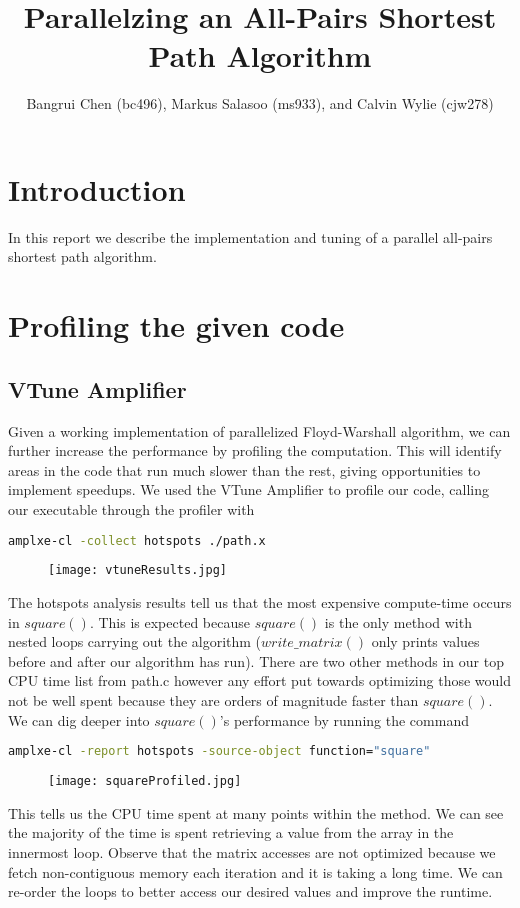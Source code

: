 \documentclass[11pt]{article}
\title{Parallelzing an All-Pairs Shortest Path Algorithm}
\author{Bangrui Chen (bc496), Markus Salasoo (ms933), and Calvin Wylie (cjw278)}
\begin{document}
\maketitle

\section*{Introduction}

In this report we describe the implementation and tuning of a parallel all-pairs shortest
path algorithm.

\section*{Profiling the given code}

\subsection*{VTune Amplifier}
Given a working implementation of parallelized Floyd-Warshall algorithm, we can further increase the performance by profiling the computation. This will identify areas in the code that run much slower than the rest, giving opportunities to implement speedups. We used the VTune Amplifier to profile our code, calling our executable through the profiler with
\begin{lstlisting}[language=bash]
amplxe-cl -collect hotspots ./path.x
\end{lstlisting}
\begin{figure}[ht!]
\centering
\texttt{[image: vtuneResults.jpg]}
\end{figure}
The hotspots analysis results tell us that the most expensive compute-time occurs in $square()$. This is expected because $square()$ is the only method with nested loops carrying out the algorithm ($write\_matrix()$ only prints values before and after our algorithm has run).\newline\newline
There are two other methods in our top CPU time list from path.c however any effort put towards optimizing those would not be well spent because they are orders of magnitude faster than $square()$.\newline\newline
We can dig deeper into $square()$'s performance by running the command
\begin{lstlisting}[language=bash]
amplxe-cl -report hotspots -source-object function="square"
\end{lstlisting}
\begin{figure}[ht!]
\centering
\texttt{[image: squareProfiled.jpg]}
\end{figure}
This tells us the CPU time spent at many points within the method. We can see the majority of the time is spent retrieving a value from the array in the innermost loop. Observe that the matrix accesses are not optimized because we fetch non-contiguous memory each iteration and it is taking a long time. We can re-order the loops to better access our desired values and improve the runtime.\newline\newline
\end{document}
